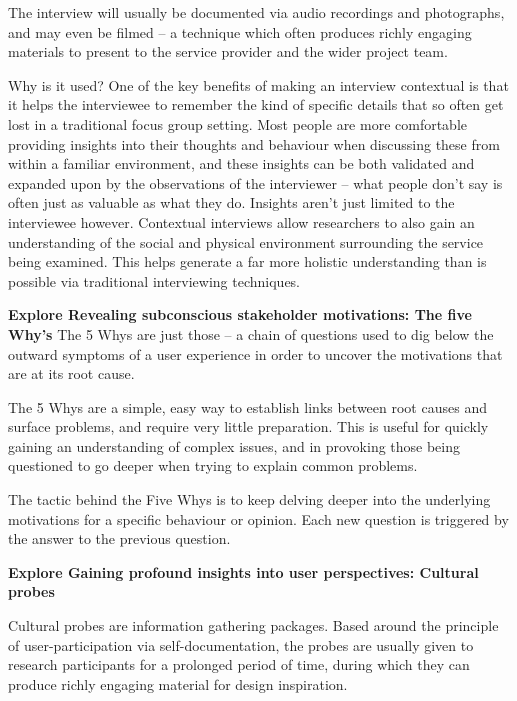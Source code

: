 The interview will usually be documented via audio recordings and photographs, and may even be filmed – a technique which often produces richly engaging materials to present to the service provider and the wider project team.

Why is it used?
One of the key benefits of making an interview contextual is that it helps the interviewee to remember the kind of specific details that so often get lost in a traditional focus group setting. Most people are more comfortable providing insights into their thoughts and behaviour when discussing these from within a familiar environment, and these insights can be both validated and expanded upon by the observations of the interviewer – what people don’t say is often just as valuable as what they do. Insights aren’t just limited to the interviewee however. Contextual interviews allow researchers to also gain an understanding of the social and physical environment surrounding the service being examined. This helps generate a far more holistic understanding than is possible via traditional interviewing techniques.

\textbf{Explore Revealing subconscious stakeholder motivations: The five Why's}
The 5 Whys are just those – a chain of questions used to dig below the outward symptoms of a user experience in order to uncover the motivations that are at its root cause.

The 5 Whys are a simple, easy way to establish links between root causes and surface problems, and require very little preparation. This is useful for quickly gaining an understanding of complex issues, and in provoking those being questioned to go deeper when trying to explain common problems.


The tactic behind the Five Whys is to keep delving deeper into the underlying motivations for a specific behaviour or opinion. Each new question is triggered by the answer to the previous question.

\textbf{Explore Gaining profound insights into user perspectives: Cultural probes}

Cultural probes are information gathering packages. Based around the principle of user-participation via self-documentation, the probes are usually given to research participants for a prolonged period of time, during which they can produce richly engaging material for design inspiration.

